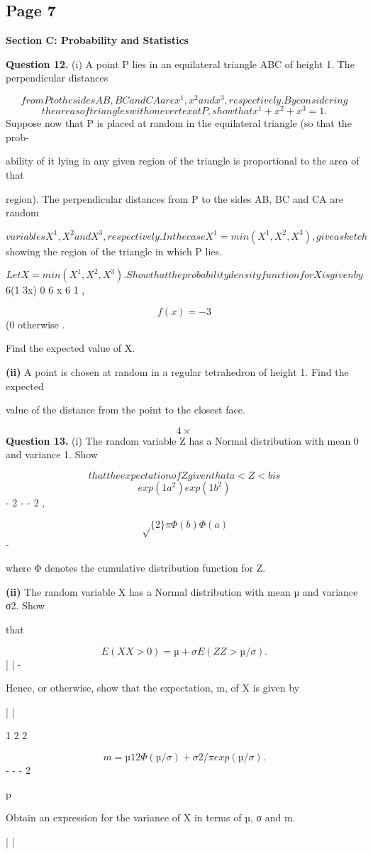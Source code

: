 \documentclass[12pt]{article}
\begin{document}
\subsection*{Page 7}
\begin{flushleft}
\bigskip\textbf{Section C: Probability and Statistics}\par
\bigskip\textbf{Question 12.} (i) A point P lies in an equilateral triangle ABC of height 1. The perpendicular distances\par
\[from P to the sides AB, BC and CA are x^1, x^2 and x^3, respectively. By considering\]
\[the areas of triangles with one vertex at P , show that x^1 + x^2 + x^3 = 1.\]
Suppose now that P is placed at random in the equilateral triangle (so that the prob-\par
ability of it lying in any given region of the triangle is proportional to the area of that\par
region). The perpendicular distances from P to the sides AB, BC and CA are random\par
\[variables X^1, X^2 and X^3, respectively. In the case X^1 = min(X^1, X^2, X^3), give a sketch\]
showing the region of the triangle in which P lies.\par
\[Let X = min(X^1, X^2, X^3). Show that the probability density function for X is given by\]
6(1 3x) 0 6 x 6 1 ,\par
\[f(x) = - 3\]
(0 otherwise .\par
Find the expected value of X.\par
\textbf{(ii)} A point is chosen at random in a regular tetrahedron of height 1. Find the expected\par
value of the distance from the point to the closest face.\par
[The volume of a tetrahedron is area of base height and its centroid is a distance\par
\[1 3 \times \times\]
height from the base.]\par
\[4 \times\]
\bigskip\textbf{Question 13.} (i) The random variable Z has a Normal distribution with mean 0 and variance 1. Show\par
\[that the expectation of Z given that a < Z < b is\]
\[exp( 1 a^2) exp( 1 b^2)\]
- 2 - - 2 ,\par
\[\sqrt\{2\}\pi Φ(b) Φ(a)\]
-\par
where Φ denotes the cumulative distribution function for Z.\par
\textbf{(ii)} The random variable X has a Normal distribution with mean µ and variance σ2. Show\par
that\par
\[E(X X > 0) = µ + σE(Z Z > µ/σ).\]
| | -\par
Hence, or otherwise, show that the expectation, m, of X is given by\par
| |\par
1 2 2\par
\[m = µ 1 2Φ( µ/σ) + σ 2/\pi exp( µ /σ ) .\]
- - - 2\par
p\par
Obtain an expression for the variance of X in terms of µ, σ and m.\par
| |\par
\end{flushleft}
\end{document}
